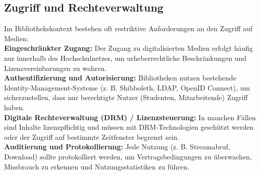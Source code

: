 \documentclass[12pt,a4paper]{report}
\begin{document}
\subsection{Zugriff und Rechteverwaltung}  
Im Bibliothekskontext bestehen oft restriktive Anforderungen an den Zugriff auf Medien:
\\
\newline
\textbf{Eingeschränkter Zugang:} Der Zugang zu digitalisierten Medien erfolgt häufig nur innerhalb des Hochschulnetzes, 
um urheberrechtliche Beschränkungen und Lizenzvereinbarungen zu wahren.  
\\
\newline
\textbf{Authentifizierung und Autorisierung:} Bibliotheken nutzen bestehende Identity-Management-Systeme (z. B. Shibboleth, LDAP, OpenID Connect), 
um sicherzustellen, dass nur berechtigte Nutzer (Studenten, Mitarbeitende) Zugriff haben.  
\\
\newline
\textbf{Digitale Rechteverwaltung (DRM) / Lizenzsteuerung:} In manchen Fällen sind Inhalte lizenzpflichtig und müssen mit DRM-Technologien geschützt werden 
oder der Zugriff auf bestimmte Zeitfenster begrenzt sein.  
\\
\newline
\textbf{Auditierung und Protokollierung:} Jede Nutzung (z. B. Streamabruf, Download) sollte protokolliert werden, 
um Vertragsbedingungen zu überwachen, Missbrauch zu erkennen und Nutzungsstatistiken zu führen.  
\end{document}
